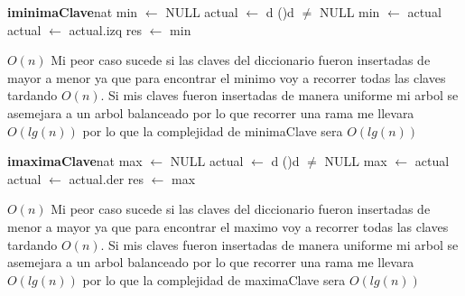 \begin{Algoritmos}
\begin{algoritmo}{\textbf{iminimaClave}}{}{nat}
			min $\leftarrow$ NULL 
            actual $\leftarrow$ d 
            \While(){d $\neq$ NULL}{
            	min $\leftarrow$ actual 
                actual $\leftarrow$ actual.izq 
            }
            res $\leftarrow$ min 
\end{algoritmo}
\datosAlgoritmo{} %
  {} %
  {} %
  {$O(n)$} %
  {Mi peor caso sucede si las claves del diccionario fueron insertadas de mayor a menor ya que para encontrar el minimo voy a recorrer todas las claves tardando $O(n)$. Si mis claves fueron insertadas de manera uniforme mi arbol se asemejara a un arbol balanceado por lo que recorrer una rama me llevara $O(lg(n))$ por lo que la complejidad de minimaClave sera $O(lg(n))$} %
  
\begin{algoritmo}{\textbf{imaximaClave}}{}{nat}
			max $\leftarrow$ NULL 
            actual $\leftarrow$ d 
            \While(){d $\neq$ NULL}{
            	max $\leftarrow$ actual 
                actual $\leftarrow$ actual.der
            }
            res $\leftarrow$ max 
\end{algoritmo}
\datosAlgoritmo{} %
  {} %
  {} %
  {$O(n)$} %
  {Mi peor caso sucede si las claves del diccionario fueron insertadas de menor a mayor ya que para encontrar el maximo voy a recorrer todas las claves tardando $O(n)$. Si mis claves fueron insertadas de manera uniforme mi arbol se asemejara a un arbol balanceado por lo que recorrer una rama me llevara $O(lg(n))$ por lo que la complejidad de maximaClave sera $O(lg(n))$} %





\end{Algoritmos}
















